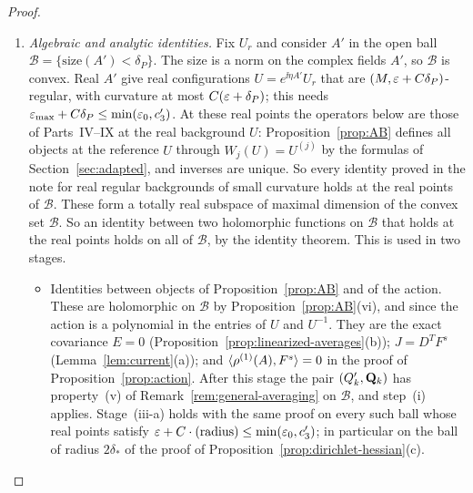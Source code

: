 \begin{proof}
\begin{enumerate}[label=(\roman*)]
\begin{itemize}
  \end{itemize}
\item \emph{Algebraic and analytic identities.} Fix $U_r$ and consider $A'$ in the open ball $\mathcal B=\{\text{size}(A')<\delta_P\}$. The size is a norm on the complex fields $A'$, so $\mathcal B$ is convex. Real $A'$ give real configurations $U=e^{\ii\eta A'}U_r$ that are $(M,\varepsilon+C\delta_P)$-regular, with curvature at most $C(\varepsilon+\delta_P)$; this needs $\varepsilon_{\max}+C\delta_P\le\min(\varepsilon_0,c'_3)$. At these real points the operators below are those of Parts~IV--IX at the real background $U$: Proposition~\ref{prop:AB} defines all objects at the reference $U$ through $W_j(U)=U^{(j)}$ by the formulas of Section~\ref{sec:adapted}, and inverses are unique. So every identity proved in the note for real regular backgrounds of small curvature holds at the real points of $\mathcal B$. These form a totally real subspace of maximal dimension of the convex set $\mathcal B$. So an identity between two holomorphic functions on $\mathcal B$ that holds at the real points holds on all of $\mathcal B$, by the identity theorem. This is used in two stages.
  \begin{itemize}
  \item[(iii-a)] Identities between objects of Proposition~\ref{prop:AB} and of the action. These are holomorphic on $\mathcal B$ by Proposition~\ref{prop:AB}(vi), and since the action is a polynomial in the entries of $U$ and $U^{-1}$. They are the exact covariance $E=0$ (Proposition~\ref{prop:linearized-averages}(b)); $J=D^TF^s$ (Lemma~\ref{lem:current}(a)); and $\langle \rho^{(1)}(A),F^s\rangle=0$ in the proof of Proposition~\ref{prop:action}. After this stage the pair $(Q'_k,\mathbf Q_k)$ has property~(v) of Remark~\ref{rem:general-averaging} on $\mathcal B$, and step~(i) applies. Stage~(iii-a) holds with the same proof on every such ball whose real points satisfy $\varepsilon+C\cdot(\text{radius})\le\min(\varepsilon_0,c'_3)$; in particular on the ball of radius $2\delta_*$ of the proof of Proposition~\ref{prop:dirichlet-hessian}(c).

\end{itemize}
\end{enumerate}
\end{proof}
